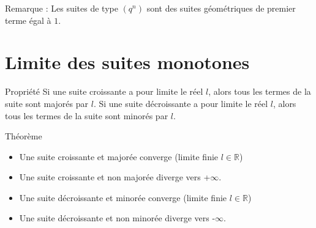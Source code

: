 \documentclass[11pt,a4paper]{article}
\begin{document}
\begin{boiteRemarque}{Remarque :}
    Les suites de type $(q^n)$ sont des suites géométriques de premier terme égal à $1$.
\end{boiteRemarque}

\section{Limite des suites monotones}

\begin{boiteProp}{Propriété}
    Si une suite croissante a pour limite le réel $l$, alors tous les termes de la suite sont majorés par $l$. 
    Si une suite décroissante a pour limite le réel $l$, alors tous les termes de la suite sont minorés par $l$.
\end{boiteProp}

\begin{boiteProp}{Théorème}
    \begin{itemize}
        \item Une suite croissante et majorée converge (limite finie $l \in \mathbb{R}$)
        \item Une suite croissante et non majorée diverge vers +$\infty$.
        \item Une suite décroissante et minorée converge (limite finie $l \in \mathbb{R}$)
        \item Une suite décroissante et non minorée diverge vers -$\infty$.
    \end{itemize}
\end{boiteProp}
\end{document}
